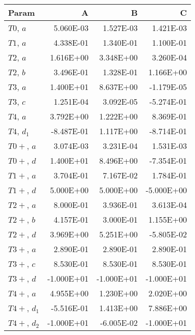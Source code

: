 \begin{tabular}{lrrr}
\toprule
 Param        &          A &          B &          C \\
\midrule
 $T0$, $a$    &  \num{5.060E-03} &  \num{1.527E-03} &  \num{1.421E-03} \\
 $T1$, $a$    &  \num{4.338E-01} &  \num{1.340E-01} &  \num{1.100E-01} \\
 $T2$, $a$    &  \num{1.616E+00} &  \num{3.348E+00} &  \num{3.260E-04} \\
 $T2$, $b$    &  \num{3.496E-01} &  \num{1.328E-01} &  \num{1.166E+00} \\
 $T3$, $a$    &  \num{1.400E+01} &  \num{8.637E+00} & \num{-1.179E-05} \\
 $T3$, $c$    &  \num{1.251E-04} &  \num{3.092E-05} & \num{-5.274E-01} \\
 $T4$, $a$    &  \num{3.792E+00} &  \num{1.222E+00} &  \num{8.369E-01} \\
 $T4$, $d_1$  & \num{-8.487E-01} &  \num{1.117E+00} & \num{-8.714E-01} \\
 $T0+$, $a$   &  \num{3.074E-03} &  \num{3.231E-04} &  \num{1.531E-03} \\
 $T0+$, $d$   &  \num{1.400E+01} &  \num{8.496E+00} & \num{-7.354E-01} \\
 $T1+$, $a$   &  \num{3.704E-01} &  \num{7.167E-02} &  \num{1.784E-01} \\
 $T1+$, $d$   &  \num{5.000E+00} &  \num{5.000E+00} & \num{-5.000E+00} \\
 $T2+$, $a$   &  \num{8.000E-01} &  \num{3.936E-01} &  \num{3.613E-04} \\
 $T2+$, $b$   &  \num{4.157E-01} &  \num{3.000E-01} &  \num{1.155E+00} \\
 $T2+$, $d$   &  \num{3.969E+00} &  \num{5.251E+00} & \num{-5.805E-02} \\
 $T3+$, $a$   &  \num{2.890E-01} &  \num{2.890E-01} &  \num{2.890E-01} \\
 $T3+$, $c$   &  \num{8.530E-01} &  \num{8.530E-01} &  \num{8.530E-01} \\
 $T3+$, $d$   & \num{-1.000E+01} & \num{-1.000E+01} & \num{-1.000E+01} \\
 $T4+$, $a$   &  \num{4.955E+00} &  \num{1.230E+00} &  \num{2.020E+00} \\
 $T4+$, $d_1$ & \num{-5.516E-01} &  \num{1.413E+00} &  \num{7.886E+00} \\
 $T4+$, $d_2$ & \num{-1.000E+01} & \num{-6.005E-02} & \num{-1.000E+01} \\
\bottomrule
\end{tabular}